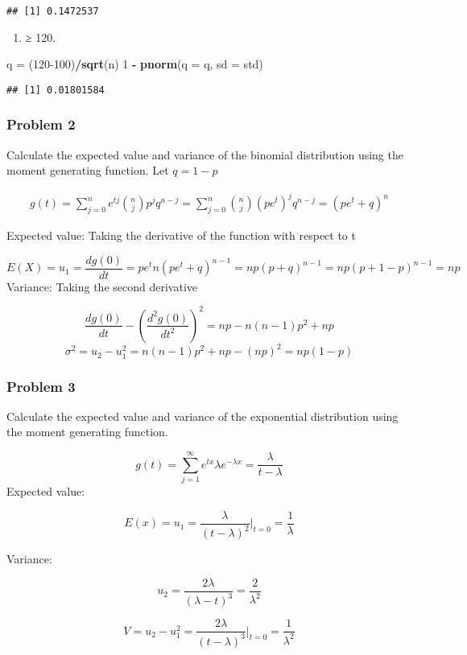 \documentclass[
]{article}
\newenvironment{Shaded}{\begin{snugshade}}{\end{snugshade}}
\newcommand{\DataTypeTok}[1]{\textcolor[rgb]{0.13,0.29,0.53}{#1}}
\newcommand{\DecValTok}[1]{\textcolor[rgb]{0.00,0.00,0.81}{#1}}
\newcommand{\KeywordTok}[1]{\textcolor[rgb]{0.13,0.29,0.53}{\textbf{#1}}}
\newcommand{\NormalTok}[1]{#1}
\newcommand{\OperatorTok}[1]{\textcolor[rgb]{0.81,0.36,0.00}{\textbf{#1}}}
\newcommand{\StringTok}[1]{\textcolor[rgb]{0.31,0.60,0.02}{#1}}
\providecommand{\tightlist}{%
  \setlength{\itemsep}{0pt}\setlength{\parskip}{0pt}}
\begin{document}
\begin{verbatim}
## [1] 0.1472537
\end{verbatim}

\begin{enumerate}
\def\labelenumi{(\alph{enumi})}
\setcounter{enumi}{2}
\tightlist
\item
  ≥ 120.
\end{enumerate}

\begin{Shaded}
\begin{Highlighting}[]
\NormalTok{q =}\StringTok{ }\NormalTok{(}\DecValTok{120-100}\NormalTok{)}\OperatorTok{/}\KeywordTok{sqrt}\NormalTok{(n)}
\DecValTok{1} \OperatorTok{-}\StringTok{ }\KeywordTok{pnorm}\NormalTok{(}\DataTypeTok{q =}\NormalTok{ q, }\DataTypeTok{sd =}\NormalTok{ std)}
\end{Highlighting}
\end{Shaded}

\begin{verbatim}
## [1] 0.01801584
\end{verbatim}

\hypertarget{problem-2}{%
\subsubsection{Problem 2}\label{problem-2}}

Calculate the expected value and variance of the binomial distribution
using the moment generating function. Let \(q=1-p\)

\begin{align*}
g(t) = \sum_{j=0}^{n} e^{tj}{n \choose j}p^jq^{n-j}
     = \sum_{j=0}^{n} {n \choose j}(pe^t)^jq^{n-j}
     =(pe^t+ q)^n
\end{align*}

Expected value: Taking the derivative of the function with respect to t

\[E(X) =u_1=\frac{dg(0)}{dt} = pe^t n(pe^t+ q)^{n-1} = np(p + q)^{n-1} = np (p + 1 - p)^{n-1} = np\]
Variance: Taking the second derivative

\[\frac{dg(0)}{dt} - (\frac{d^2g(0)}{dt^2})^2 = np - n(n-1)p^2+np\]
\[\sigma^2 = u_2 - u_1^2 = n(n-1)p^2+np - (np)^2 =  np(1-p)\]

\hypertarget{problem-3}{%
\subsubsection{Problem 3}\label{problem-3}}

Calculate the expected value and variance of the exponential
distribution using the moment generating function.

\[g(t) =  \sum_{j=1}^{\infty} e^{tx}\lambda e^{-\lambda x} = \frac{\lambda}{t- \lambda}\]
Expected value:

\[E(x) = u_1 = \frac{\lambda}{(t- \lambda)^2}|_{t=0} = \frac{1}{\lambda}\]

Variance:

\[ u_2 = \frac{2\lambda}{(\lambda-t)^3}=\frac{2}{\lambda^2}\]

\[V = u_2-u_1^2 = \frac{2\lambda}{(t- \lambda)^3}|_{t=0} = \frac{1}{\lambda^2}\]
\end{document}
